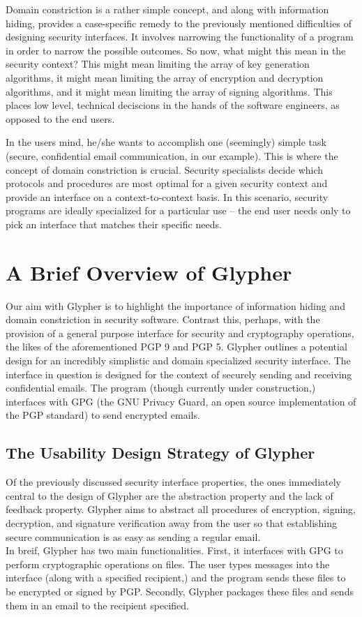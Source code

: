 \documentclass[journal]{IEEEtran}
\begin{document}
Domain constriction is a rather simple concept, and along with information hiding, provides a case-specific remedy to the previously mentioned difficulties of designing security interfaces. It involves narrowing the functionality of a program in order to narrow the possible outcomes. So now, what might this mean in the security context? This might mean limiting the array of key generation algorithms, it might mean limiting the array of encryption and decryption algorithms, and it might mean limiting the array of signing algorithms. This places low level, technical deciscions in the hands of the software engineers, as opposed to the end users. 

In the users mind, he/she wants to accomplish one (seemingly) simple task (secure, confidential email communication, in our example). This is where the concept of domain constriction is crucial. Security specialists decide which protocols and procedures are most optimal for a given security context and provide an interface on a context-to-context basis. In this scenario, security programs are ideally specialized for a particular use -- the end user needs only to pick an interface that matches their specific needs.

\section{A Brief Overview of Glypher}

Our aim with Glypher is to highlight the importance of information hiding and domain constriction in security software. Contrast this, perhaps, with the provision of a general purpose interface for security and cryptography operations, the likes of the aforementioned PGP 9 and PGP 5. Glypher outlines a potential design for an incredibly simplistic and domain specialized security interface. The interface in question is designed for the context of securely sending and receiving confidential emails. The program (though currently under construction,) interfaces with GPG (the GNU Privacy Guard, an open source implementation of the PGP standard) to send encrypted emails.

\subsection{The Usability Design Strategy of Glypher}
Of the previously discussed security interface properties, the ones immediately central to the design of Glypher are the abstraction property and the lack of feedback property. Glypher aims to abstract all procedures of encryption, signing, decryption, and signature verification away from the user so that establishing secure communication is as easy as sending a regular email.\\
In breif, Glypher has two main functionalities. First, it interfaces with GPG to perform cryptographic operations on files. The user types messages into the interface (along with a specified recipient,) and the program sends these files to be encrypted or signed by PGP. Secondly, Glypher packages these files and sends them in an email to the recipient specified. 
\end{document}
